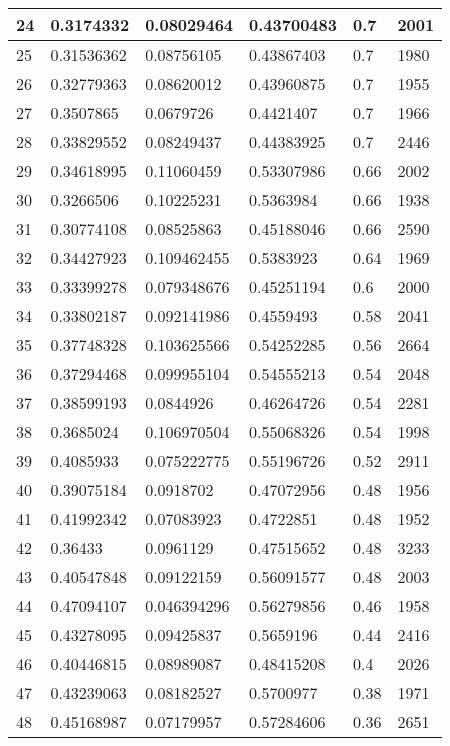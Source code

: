 \begin{longtable}{|l|l|l|l|l|l|}
24 & 0.3174332 & 0.08029464 & 0.43700483 & 0.7 & 2001 \\ \hline 
25 & 0.31536362 & 0.08756105 & 0.43867403 & 0.7 & 1980 \\ \hline 
26 & 0.32779363 & 0.08620012 & 0.43960875 & 0.7 & 1955 \\ \hline 
27 & 0.3507865 & 0.0679726 & 0.4421407 & 0.7 & 1966 \\ \hline 
28 & 0.33829552 & 0.08249437 & 0.44383925 & 0.7 & 2446 \\ \hline 
29 & 0.34618995 & 0.11060459 & 0.53307986 & 0.66 & 2002 \\ \hline 
30 & 0.3266506 & 0.10225231 & 0.5363984 & 0.66 & 1938 \\ \hline 
31 & 0.30774108 & 0.08525863 & 0.45188046 & 0.66 & 2590 \\ \hline 
32 & 0.34427923 & 0.109462455 & 0.5383923 & 0.64 & 1969 \\ \hline 
33 & 0.33399278 & 0.079348676 & 0.45251194 & 0.6 & 2000 \\ \hline 
34 & 0.33802187 & 0.092141986 & 0.4559493 & 0.58 & 2041 \\ \hline 
35 & 0.37748328 & 0.103625566 & 0.54252285 & 0.56 & 2664 \\ \hline 
36 & 0.37294468 & 0.099955104 & 0.54555213 & 0.54 & 2048 \\ \hline 
37 & 0.38599193 & 0.0844926 & 0.46264726 & 0.54 & 2281 \\ \hline 
38 & 0.3685024 & 0.106970504 & 0.55068326 & 0.54 & 1998 \\ \hline 
39 & 0.4085933 & 0.075222775 & 0.55196726 & 0.52 & 2911 \\ \hline 
40 & 0.39075184 & 0.0918702 & 0.47072956 & 0.48 & 1956 \\ \hline 
41 & 0.41992342 & 0.07083923 & 0.4722851 & 0.48 & 1952 \\ \hline 
42 & 0.36433 & 0.0961129 & 0.47515652 & 0.48 & 3233 \\ \hline 
43 & 0.40547848 & 0.09122159 & 0.56091577 & 0.48 & 2003 \\ \hline 
44 & 0.47094107 & 0.046394296 & 0.56279856 & 0.46 & 1958 \\ \hline 
45 & 0.43278095 & 0.09425837 & 0.5659196 & 0.44 & 2416 \\ \hline 
46 & 0.40446815 & 0.08989087 & 0.48415208 & 0.4 & 2026 \\ \hline 
47 & 0.43239063 & 0.08182527 & 0.5700977 & 0.38 & 1971 \\ \hline 
48 & 0.45168987 & 0.07179957 & 0.57284606 & 0.36 & 2651 \\ \hline 

\end{longtable}
